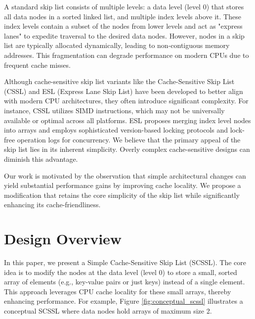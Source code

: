 \documentclass{article}
\begin{document}
A standard skip list consists of multiple levels: a data level (level 0) that stores all data nodes in a sorted linked list, and multiple index levels above it. These index levels contain a subset of the nodes from lower levels and act as "express lanes" to expedite traversal to the desired data nodes. However, nodes in a skip list are typically allocated dynamically, leading to non-contiguous memory addresses. This fragmentation can degrade performance on modern CPUs due to frequent cache misses.

Although cache-sensitive skip list variants like the Cache-Sensitive Skip List (CSSL) \cite{CSSL20XX} and ESL (Express Lane Skip List) \cite{ESL20XX} have been developed to better align with modern CPU architectures, they often introduce significant complexity. For instance, CSSL utilizes SIMD instructions, which may not be universally available or optimal across all platforms. ESL proposes merging index level nodes into arrays and employs sophisticated version-based locking protocols and lock-free operation logs for concurrency. We believe that the primary appeal of the skip list lies in its inherent simplicity. Overly complex cache-sensitive designs can diminish this advantage.

Our work is motivated by the observation that simple architectural changes can yield substantial performance gains by improving cache locality. We propose a modification that retains the core simplicity of the skip list while significantly enhancing its cache-friendliness.

\section{Design Overview}
\label{sec:design_overview}

In this paper, we present a Simple Cache-Sensitive Skip List (SCSSL). The core idea is to modify the nodes at the data level (level 0) to store a small, sorted array of elements (e.g., key-value pairs or just keys) instead of a single element. This approach leverages CPU cache locality for these small arrays, thereby enhancing performance. For example, Figure \ref{fig:conceptual_scssl} illustrates a conceptual SCSSL where data nodes hold arrays of maximum size 2.
\end{document}
